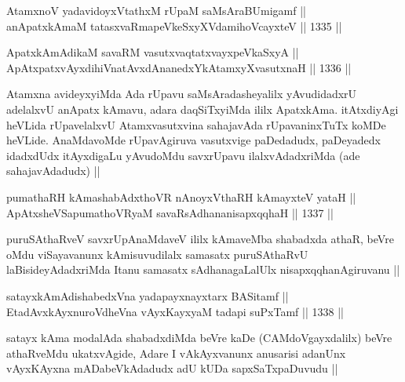 
\begin{shl}
AtamxnoV yadavidoyxVtathxM rUpaM saMsAraBUmigamf || \\
anApatxkAmaM tatasxvaRmapeVkeSxyXVdamihoVcayxteV ||  1335 ||  
\end{shl}
				
\begin{shl}
ApatxkAmAdikaM savaRM vasutxvaqtatxvayxpeVkaSxyA || \\
ApAtxpatxvAyxdihiVnatAvxdAnanedxYkAtamxyXvasutxnaH ||  1336 ||  
\end{shl}

\begin{artha}
Atamxna avideyxyiMda Ada rUpavu saMsAradasheyalilx yAvudidadxrU adelalxvU anApatx kAmavu, adara daqSiTxyiMda ililx ApatxkAma. itAtxdiyAgi heVLida rUpavelalxvU Atamxvasutxvina sahajavAda rUpavaninxTuTx koMDe heVLide. AnaMdavoMde rUpavAgiruva vasutxvige paDedadudx, paDeyadedx idadxdUdx itAyxdigaLu yAvudoMdu savxrUpavu ilalxvAdadxriMda (ade sahajavAdadudx) ||
\end{artha}


\begin{shl}
pumathaRH kAmashabAdxthoVR nAnoyxV\s thaRH kAmayxteV yataH || \\
ApAtxsheVSapumathoVR\s yaM savaRsAdhananisapxqqhaH ||  1337 ||  
\end{shl}

\begin{artha}
puruSAthaRveV savxrUpAnaMdaveV ililx kAmaveMba shabadxda athaR, beVre oMdu viSayavanunx kAmisuvudilalx samasatx puruSAthaRvU laBisideyAdadxriMda Itanu samasatx sAdhanagaLalUlx nisapxqqhanAgiruvanu ||
\end{artha}


\begin{shl}
satayxkAmAdishabedxVna yadapayxnayxtarx BASitamf || \\
EtadAvxkAyxnuroVdheVna vAyxKayxyaM tadapi suPxTamf ||  1338 ||  
\end{shl}

\begin{artha}
satayx kAma modalAda shabadxdiMda beVre kaDe (CAMdoVgayxdalilx) beVre athaRveMdu ukatxvAgide, Adare I vAkAyxvanunx anusarisi adanUnx vAyxKAyxna mADabeVkAdadudx adU kUDa sapxSaTxpaDuvudu ||
\end{artha}

